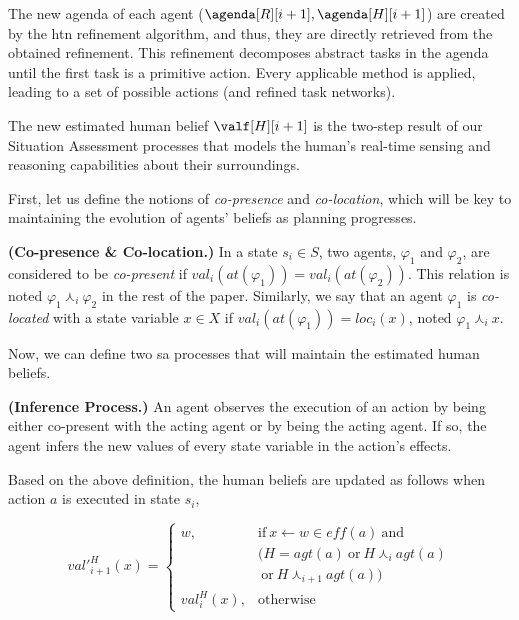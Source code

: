 {The new agenda of each agent ($\agenda[R][i+1], \agenda[H][i+1]$) are created by the \acrshort{htn} refinement algorithm, and thus, they are directly retrieved from the obtained refinement. 
This refinement decomposes abstract tasks in the agenda until the first task is a primitive action. Every applicable method is applied, leading to a set of possible actions (and refined task networks).

The new estimated human belief $\valf[H][i+1]$ is the two-step result of our Situation Assessment processes that models the human's real-time sensing and reasoning capabilities about their surroundings.

First, let us define the notions of \textit{co-presence} and \textit{co-location}, which will be key to maintaining the evolution of agents' beliefs as planning progresses.

\begin{definition} \label{def:co-pre-loc}
    \textbf{(Co-presence \& Co-location.)} In a state $s_i \in S$, two agents, $\varphi_1$ and $\varphi_2$, are considered to be \textit{co-present} if $val_i(at(\varphi_1)) = val_i(at(\varphi_2))$. This relation is noted $\varphi_1 \curlywedge_i \varphi_2$ in the rest of the paper. Similarly, we say that an agent $\varphi_1$ is \textit{co-located} with a state variable $x \in X$ if $val_i(at(\varphi_1)) = loc_i(x)$, noted $\varphi_1 \curlywedge_i x$.
\end{definition}

Now, we can define two \acrfull{sa} processes that will maintain the estimated human beliefs.

\begin{definition} \label{def:new_inf}
    \textbf{(Inference Process.)} An agent observes the execution of an action by being either co-present with the acting agent 
    or by being the acting agent. If so, the agent infers the new values of every state variable in the action's effects.
\end{definition}

Based on the above definition, the human beliefs are updated as follows when action $a$ is executed in state $s_i$, 

\begin{equation}
val'^H_{i+1}(x) = \left\{ 
\begin{array}{ll}
    w, & \mbox{if} ~ x \leftarrow w \in \textit{eff}(a) ~ \mbox{and}  \\ 
    & (H = \textit{agt}(a) ~\mbox{or}~ H \curlywedge_i \textit{agt}(a)\\
    & ~\mbox{or}~ H \curlywedge_{i+1} \textit{agt}(a))\\
    val^H_i(x), & \mbox{otherwise}
\end{array}\right.
\end{equation}

}
